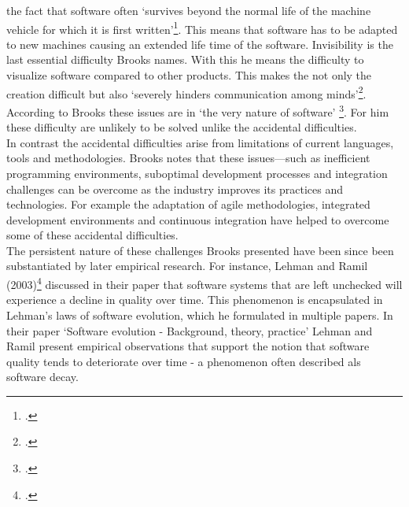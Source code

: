 the fact that software often `survives beyond the normal life of the machine vehicle for which it is first written'\footcite[4]{brooksNoSilverBullet1987}. This means that software has to be adapted to new machines causing an extended life time of the software.
Invisibility is the last essential difficulty Brooks names. With this he means the difficulty to visualize software compared to other products. This makes the not only the creation difficult but also `severely hinders communication among minds'\footcite[4]{brooksNoSilverBullet1987}.
According to Brooks these issues are in `the very nature of software' \footcite[2]{brooksNoSilverBullet1987}. For him these difficulty are unlikely to be solved unlike the accidental difficulties.\\

In contrast the accidental difficulties arise from limitations of current languages, tools and methodologies. Brooks notes that these issues—such as inefficient programming environments, suboptimal development processes and integration challenges can be overcome as the industry improves its practices and technologies.
For example the adaptation of agile methodologies, integrated development environments and continuous integration have helped to overcome some of these accidental difficulties.\\

The persistent nature of these challenges Brooks presented have been since been substantiated by later empirical research. For instance, Lehman and Ramil (2003)\footcite{lehmanSoftwareEvolutionBackground2003} discussed in their paper that software systems that are left unchecked will experience a decline in quality over time.
This phenomenon is encapsulated in Lehman's laws of software evolution, which he formulated in multiple papers. In their paper `Software evolution - Background, theory, practice' Lehman and Ramil present empirical observations that support the notion that software quality tends to deteriorate over time - a phenomenon often described als
software decay. 

